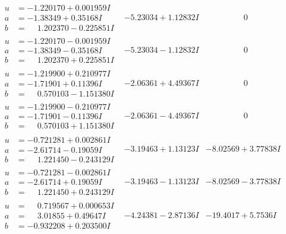 \documentclass[1p]{elsarticle_modified}
\theoremstyle{definition}
\begin{document}
$$\begin{array}{c|c|c}
\begin{aligned}
u &= -1.220170 + 0.001959 I \\
a &= -1.38349 + 0.35168 I \\
b &= \phantom{-}1.202370 - 0.225851 I\end{aligned}
 & -5.23034 + 1.12832 I & \phantom{-0.000000 } 0 \\ \hline\begin{aligned}
u &= -1.220170 - 0.001959 I \\
a &= -1.38349 - 0.35168 I \\
b &= \phantom{-}1.202370 + 0.225851 I\end{aligned}
 & -5.23034 - 1.12832 I & \phantom{-0.000000 } 0 \\ \hline\begin{aligned}
u &= -1.219900 + 0.210977 I \\
a &= -1.71901 + 0.11396 I \\
b &= \phantom{-}0.570103 - 1.151380 I\end{aligned}
 & -2.06361 + 4.49367 I & \phantom{-0.000000 } 0 \\ \hline\begin{aligned}
u &= -1.219900 - 0.210977 I \\
a &= -1.71901 - 0.11396 I \\
b &= \phantom{-}0.570103 + 1.151380 I\end{aligned}
 & -2.06361 - 4.49367 I & \phantom{-0.000000 } 0 \\ \hline\begin{aligned}
u &= -0.721281 + 0.002861 I \\
a &= -2.61714 - 0.19059 I \\
b &= \phantom{-}1.221450 - 0.243129 I\end{aligned}
 & -3.19463 + 1.13123 I & -8.02569 + 3.77838 I \\ \hline\begin{aligned}
u &= -0.721281 - 0.002861 I \\
a &= -2.61714 + 0.19059 I \\
b &= \phantom{-}1.221450 + 0.243129 I\end{aligned}
 & -3.19463 - 1.13123 I & -8.02569 - 3.77838 I \\ \hline\begin{aligned}
u &= \phantom{-}0.719567 + 0.000653 I \\
a &= \phantom{-}3.01855 + 0.49647 I \\
b &= -0.932208 + 0.203500 I\end{aligned}
 & -4.24381 - 2.87136 I & -19.4017 + 5.7536 I \\ \hline\begin{aligned}

\end{aligned}
\end{array}$$
\end{document}
